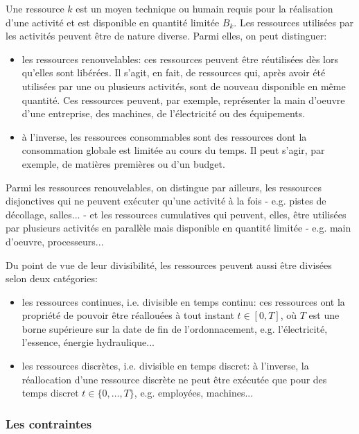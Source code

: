 Une ressource $k$ est un moyen technique ou humain requis pour la
réalisation d'une activité et est disponible en quantité limitée $B_k$. 
Les ressources utilisées par les activités peuvent être de nature
diverse. Parmi elles, on peut distinguer: 
\begin{itemize}
\item les ressources renouvelables: ces ressources peuvent être
réutilisées dès lors qu'elles sont libérées. Il s'agit, en fait, de
ressources qui, après avoir été utilisées par une ou plusieurs
activités, sont de nouveau disponible en même quantité. Ces ressources
peuvent, par exemple, représenter la main d'oeuvre d'une entreprise,
des machines, de l'électricité ou des équipements.
\item à l'inverse, les ressources consommables sont des ressources
dont la consommation globale est limitée au cours du temps. Il peut
s'agir, par exemple, de matières premières ou d'un budget.
\end{itemize}

Parmi les ressources renouvelables, on distingue par ailleurs, les
ressources disjonctives qui ne peuvent exécuter qu'une activité à la
fois - e.g. pistes de décollage, salles... - et les ressources cumulatives
qui peuvent, elles,  être utilisées par plusieurs activités en
parallèle mais disponible en quantité limitée - e.g. main d'oeuvre,
processeurs...


Du point de vue de leur divisibilité, les ressources peuvent aussi
être divisées selon deux catégories: 
\begin{itemize}
\item les ressources continues, i.e. divisible en temps continu: ces
  ressources ont la propriété de pouvoir être réallouées à tout
  instant $t \in [0,T]$, où $T$ est une borne supérieure sur la date de
  fin de l'ordonnacement, e.g. l'électricité, l'essence, énergie
  hydraulique...
\item les ressources discrètes, i.e. divisible en temps discret: à
  l'inverse, la réallocation d'une ressource discrète ne peut être
  exécutée que pour des temps discret $t \in \{0,\dots,T\}$,
  e.g. employées, machines...
\end{itemize}
\subsubsection{Les contraintes}

